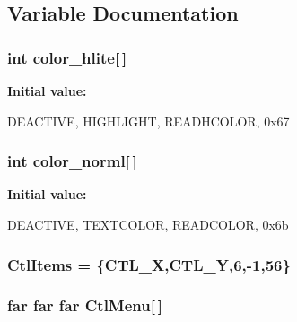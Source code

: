 \subsection{Variable Documentation}
\hypertarget{WL__MENU_8C_a0eb1bcd3103f302b8ddeff72aeeb27f2}{
\subsubsection[{color\_\-hlite}]{\setlength{\rightskip}{0pt plus 5cm}int {\bf color\_\-hlite}\mbox{[}$\,$\mbox{]}}}
\label{WL__MENU_8C_a0eb1bcd3103f302b8ddeff72aeeb27f2}
{\bfseries Initial value:}
\begin{DoxyCode}
{
   DEACTIVE,
   HIGHLIGHT,
   READHCOLOR,
   0x67
   }
\end{DoxyCode}
\hypertarget{WL__MENU_8C_a2b223cf6ceaaa765e424eff35bd4cdd9}{
\subsubsection[{color\_\-norml}]{\setlength{\rightskip}{0pt plus 5cm}int {\bf color\_\-norml}\mbox{[}$\,$\mbox{]}}}
\label{WL__MENU_8C_a2b223cf6ceaaa765e424eff35bd4cdd9}
{\bfseries Initial value:}
\begin{DoxyCode}
{
   DEACTIVE,
   TEXTCOLOR,
   READCOLOR,
   0x6b
   }
\end{DoxyCode}
\hypertarget{WL__MENU_8C_aa93dc2e5fac3ee3c385889cde68024dc}{
\subsubsection[{CtlItems}]{ {\bf CtlItems} = \{CTL\_\-X,CTL\_\-Y,6,-\/1,56\}}}
\label{WL__MENU_8C_aa93dc2e5fac3ee3c385889cde68024dc}
\hypertarget{WL__MENU_8C_a9bb024a29eb8f889628f83ebfce7ee3e}{
\subsubsection[{CtlMenu}]{ far far far {\bf CtlMenu}\mbox{[}$\,$\mbox{]}}}
